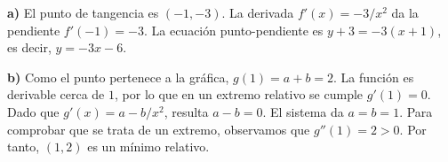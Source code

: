\textbf{a)} El punto de tangencia es $(-1,-3)$. La derivada $f'(x)=-3/x^2$ da la pendiente $f'(-1)=-3$. La ecuación punto-pendiente es $y+3=-3(x+1)$, es decir, $\boxed{y=-3x-6}$.

\textbf{b)} Como el punto pertenece a la gráfica, $g(1)=a+b=2$. La función es derivable cerca de $1$, por lo que en un extremo relativo se cumple $g'(1)=0$. Dado que $g'(x)=a-b/x^2$, resulta $a-b=0$. El sistema da $\boxed{a=b=1}$. Para comprobar que se trata de un extremo, observamos que $g''(1)=2>0$. Por tanto, $(1,2)$ es un mínimo relativo.
